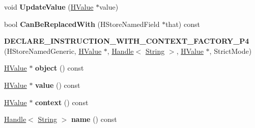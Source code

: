 \begin{DoxyCompactItemize}
\item 
\hypertarget{classv8_1_1internal_1_1_v8___f_i_n_a_l_a901c264e49c199c857e85113572c1cff}{}void {\bfseries Update\+Value} (\hyperlink{classv8_1_1internal_1_1_h_value}{H\+Value} $\ast$value)\label{classv8_1_1internal_1_1_v8___f_i_n_a_l_a901c264e49c199c857e85113572c1cff}

\item 
\hypertarget{classv8_1_1internal_1_1_v8___f_i_n_a_l_ae4eb278c5489c1f89ff4a6712261229a}{}bool {\bfseries Can\+Be\+Replaced\+With} (H\+Store\+Named\+Field $\ast$that) const \label{classv8_1_1internal_1_1_v8___f_i_n_a_l_ae4eb278c5489c1f89ff4a6712261229a}

\item 
\hypertarget{classv8_1_1internal_1_1_v8___f_i_n_a_l_aaa683952f891778dab319da13a9c3346}{}{\bfseries D\+E\+C\+L\+A\+R\+E\+\_\+\+I\+N\+S\+T\+R\+U\+C\+T\+I\+O\+N\+\_\+\+W\+I\+T\+H\+\_\+\+C\+O\+N\+T\+E\+X\+T\+\_\+\+F\+A\+C\+T\+O\+R\+Y\+\_\+\+P4} (H\+Store\+Named\+Generic, \hyperlink{classv8_1_1internal_1_1_h_value}{H\+Value} $\ast$, \hyperlink{classv8_1_1internal_1_1_handle}{Handle}$<$ \hyperlink{classv8_1_1internal_1_1_string}{String} $>$, \hyperlink{classv8_1_1internal_1_1_h_value}{H\+Value} $\ast$, Strict\+Mode)\label{classv8_1_1internal_1_1_v8___f_i_n_a_l_aaa683952f891778dab319da13a9c3346}

\item 
\hypertarget{classv8_1_1internal_1_1_v8___f_i_n_a_l_a5cf72ed4b954f3413a0aa63069a75283}{}\hyperlink{classv8_1_1internal_1_1_h_value}{H\+Value} $\ast$ {\bfseries object} () const \label{classv8_1_1internal_1_1_v8___f_i_n_a_l_a5cf72ed4b954f3413a0aa63069a75283}

\item 
\hypertarget{classv8_1_1internal_1_1_v8___f_i_n_a_l_a998b3feae0e84bbe080297551603911f}{}\hyperlink{classv8_1_1internal_1_1_h_value}{H\+Value} $\ast$ {\bfseries value} () const \label{classv8_1_1internal_1_1_v8___f_i_n_a_l_a998b3feae0e84bbe080297551603911f}

\item 
\hypertarget{classv8_1_1internal_1_1_v8___f_i_n_a_l_a8294bece2df148267ec52228e2139030}{}\hyperlink{classv8_1_1internal_1_1_h_value}{H\+Value} $\ast$ {\bfseries context} () const \label{classv8_1_1internal_1_1_v8___f_i_n_a_l_a8294bece2df148267ec52228e2139030}

\item 
\hypertarget{classv8_1_1internal_1_1_v8___f_i_n_a_l_ae093884f144601c733c3c49b3af199b4}{}\hyperlink{classv8_1_1internal_1_1_handle}{Handle}$<$ \hyperlink{classv8_1_1internal_1_1_string}{String} $>$ {\bfseries name} () const \label{classv8_1_1internal_1_1_v8___f_i_n_a_l_ae093884f144601c733c3c49b3af199b4}


\end{DoxyCompactItemize}
